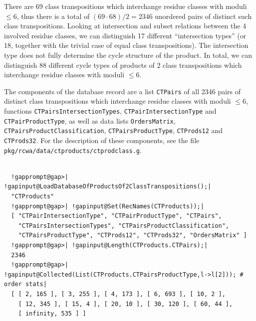 \documentclass[a4paper,11pt]{report}
\begin{document}
{{{ There are 69 class transpositions which interchange residue classes with
moduli $\leq 6$, thus there is a total of $(69 \cdot 68)/2 = 2346$ unordered pairs of distinct such class transpositions. Looking at
intersection\texttt{} and subset relations between the 4 involved
residue classes, we can distinguish 17 different ``intersection types'' (or 18, together with the trivial case of equal class transpositions). The
intersection type does not fully determine the cycle structure of the product.
\texttt{}\texttt{} In total, we can distinguish 88
different cycle types of products of 2 class transpositions which interchange
residue classes with moduli $\leq 6$. 

 The components of the database record are a list \texttt{CTPairs} of all 2346 pairs of distinct class transpositions which interchange residue
classes with moduli $\leq 6$, functions \texttt{CTPairsIntersectionTypes}, \texttt{CTPairIntersectionType} and \texttt{CTPairProductType}, as well as data lists \texttt{OrdersMatrix}, \texttt{CTPairsProductClassification}, \texttt{CTPairsProductType}, \texttt{CTProds12} and \texttt{CTProds32}. \texttt{}\texttt{} For the description of these
components, see the file \texttt{pkg/rcwa/data/ctproducts/ctprodclass.g}. 
\begin{Verbatim}[commandchars=!@|,fontsize=\small,frame=single,label=Example]
  
  !gapprompt@gap>| !gapinput@LoadDatabaseOfProductsOf2ClassTranspositions();|
  "CTProducts"
  !gapprompt@gap>| !gapinput@Set(RecNames(CTProducts));|
  [ "CTPairIntersectionType", "CTPairProductType", "CTPairs", 
    "CTPairsIntersectionTypes", "CTPairsProductClassification", 
    "CTPairsProductType", "CTProds12", "CTProds32", "OrdersMatrix" ]
  !gapprompt@gap>| !gapinput@Length(CTProducts.CTPairs);|
  2346
  !gapprompt@gap>| !gapinput@Collected(List(CTProducts.CTPairsProductType,l->l[2])); # order stats|
  [ [ 2, 165 ], [ 3, 255 ], [ 4, 173 ], [ 6, 693 ], [ 10, 2 ], 
    [ 12, 345 ], [ 15, 4 ], [ 20, 10 ], [ 30, 120 ], [ 60, 44 ], 
    [ infinity, 535 ] ]
  
\end{Verbatim}
 }

 

}}
\end{document}
